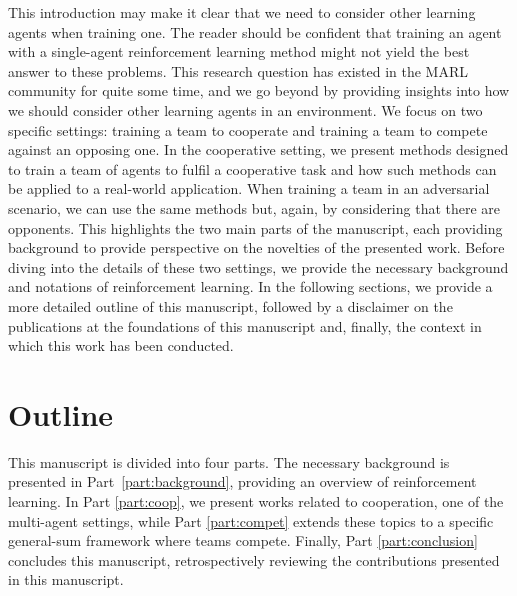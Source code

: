 This introduction may make it clear that we need to consider other learning agents when training one.
The reader should be confident that training an agent with a single-agent reinforcement learning method might not yield the best answer to these problems.
This research question has existed in the MARL community for quite some time, and we go beyond by providing insights into how we should consider other learning agents in an environment.
We focus on two specific settings: training a team to cooperate and training a team to compete against an opposing one.
In the cooperative setting, we present methods designed to train a team of agents to fulfil a cooperative task and how such methods can be applied to a real-world application.
When training a team in an adversarial scenario, we can use the same methods but, again, by considering that there are opponents.
This highlights the two main parts of the manuscript, each providing background to provide perspective on the novelties of the presented work.
Before diving into the details of these two settings, we provide the necessary background and notations of reinforcement learning.
In the following sections, we provide a more detailed outline of this manuscript, followed by a disclaimer on the publications at the foundations of this manuscript and, finally, the context in which this work has been conducted.

\section{Outline}
\label{sec:ch1_outline}
This manuscript is divided into four parts.
The necessary background is presented in Part~\ref{part:background}, providing an overview of reinforcement learning.
In Part \ref{part:coop}, we present works related to cooperation, one of the multi-agent settings, while Part \ref{part:compet} extends these topics to a specific general-sum framework where teams compete.
Finally, Part \ref{part:conclusion} concludes this manuscript, retrospectively reviewing the contributions presented in this manuscript.

